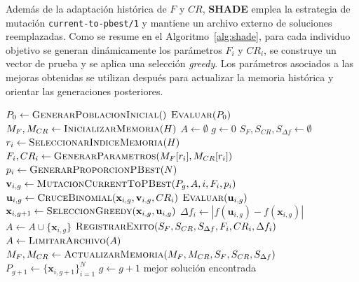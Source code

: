 Además de la adaptación histórica de \(F\) y \(CR\), \textbf{SHADE} emplea la estrategia de mutación \texttt{current-to-pbest/1} y mantiene un archivo externo de soluciones reemplazadas. Como se resume en el Algoritmo~\ref{alg:shade}, para cada individuo objetivo se generan dinámicamente los parámetros \(F_i\) y \(CR_i\), se construye un vector de prueba y se aplica una selección \textit{greedy}. Los parámetros asociados a las mejoras obtenidas se utilizan después para actualizar la memoria histórica y orientar las generaciones posteriores.

\begin{algorithm}[htbp]
    \begin{algorithmic}[1]
        \State $P_0 \gets \textsc{GenerarPoblacionInicial}()$
        \State $\textsc{Evaluar}(P_0)$
        \State $M_F, M_{CR} \gets \textsc{InicializarMemoria}(H)$
        \State $A \gets \emptyset$
        \State $g \gets 0$
        \State $S_F, S_{CR}, S_{\Delta f} \gets \emptyset$
        \State $r_i \gets \textsc{SeleccionarIndiceMemoria}(H)$
        \State $F_i, CR_i \gets
            \textsc{GenerarParametros}(M_F[r_i], M_{CR}[r_i])$
        \State $p_i \gets \textsc{GenerarProporcionPBest}(N)$
        \State $\mathbf{v}_{i,g} \gets
            \textsc{MutacionCurrentToPBest}(P_g, A, i, F_i, p_i)$
        \State $\mathbf{u}_{i,g} \gets
            \textsc{CruceBinomial}(\mathbf{x}_{i,g}, \mathbf{v}_{i,g}, CR_i)$
        \State $\textsc{Evaluar}(\mathbf{u}_{i,g})$
        \EndFor
        \State $\mathbf{x}_{i,g+1} \gets
            \textsc{SeleccionGreedy}(\mathbf{x}_{i,g}, \mathbf{u}_{i,g})$
        \State $\Delta f_i \gets
            \left|f(\mathbf{u}_{i,g}) - f(\mathbf{x}_{i,g})\right|$
        \State $A \gets A \cup \{\mathbf{x}_{i,g}\}$
        \State $\textsc{RegistrarExito}
            (S_F, S_{CR}, S_{\Delta f}, F_i, CR_i, \Delta f_i)$
        \EndIf
        \EndFor
        \State $A \gets \textsc{LimitarArchivo}(A)$
        \State $M_F, M_{CR} \gets
            \textsc{ActualizarMemoria}(M_F, M_{CR}, S_F, S_{CR}, S_{\Delta f})$
        \EndIf
        \State $P_{g+1} \gets \{\mathbf{x}_{i,g+1}\}_{i=1}^{N}$
        \State $g \gets g + 1$
        \EndWhile
        \State \Return mejor solución encontrada
    \end{algorithmic}
    \caption{\textit{Success-History based Adaptive Differential Evolution} (SHADE).}
    \label{alg:shade}
\end{algorithm}

